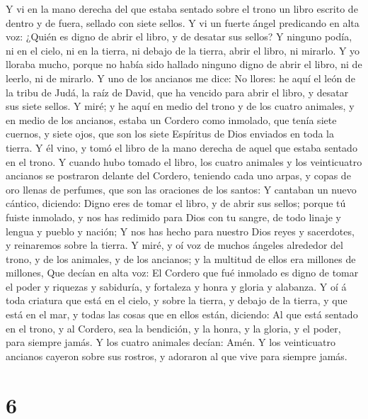  Y vi en la mano derecha del que estaba sentado sobre el
trono un libro escrito de dentro y de fuera, sellado con siete sellos.
 Y vi un fuerte ángel predicando en alta voz: ¿Quién es
digno de abrir el libro, y de desatar sus sellos?  Y ninguno
podía, ni en el cielo, ni en la tierra, ni debajo de la tierra, abrir el
libro, ni mirarlo.  Y yo lloraba mucho, porque no había sido
hallado ninguno digno de abrir el libro, ni de leerlo, ni de mirarlo.
 Y uno de los ancianos me dice: No llores: he aquí el león
de la tribu de Judá, la raíz de David, que ha vencido para abrir el
libro, y desatar sus siete sellos.  Y miré; y he aquí en
medio del trono y de los cuatro animales, y en medio de los ancianos,
estaba un Cordero como inmolado, que tenía siete cuernos, y siete ojos,
que son los siete Espíritus de Dios enviados en toda la tierra.
 Y él vino, y tomó el libro de la mano derecha de aquel que
estaba sentado en el trono.  Y cuando hubo tomado el libro,
los cuatro animales y los veinticuatro ancianos se postraron delante del
Cordero, teniendo cada uno arpas, y copas de oro llenas de perfumes, que
son las oraciones de los santos:  Y cantaban un nuevo
cántico, diciendo: Digno eres de tomar el libro, y de abrir sus sellos;
porque tú fuiste inmolado, y nos has redimido para Dios con tu sangre,
de todo linaje y lengua y pueblo y nación;  Y nos has hecho
para nuestro Dios reyes y sacerdotes, y reinaremos sobre la tierra.
 Y miré, y oí voz de muchos ángeles alrededor del trono, y
de los animales, y de los ancianos; y la multitud de ellos era millones
de millones,  Que decían en alta voz: El Cordero que fué
inmolado es digno de tomar el poder y riquezas y sabiduría, y fortaleza
y honra y gloria y alabanza.  Y oí á toda criatura que está
en el cielo, y sobre la tierra, y debajo de la tierra, y que está en el
mar, y todas las cosas que en ellos están, diciendo: Al que está sentado
en el trono, y al Cordero, sea la bendición, y la honra, y la gloria, y
el poder, para siempre jamás.  Y los cuatro animales
decían: Amén. Y los veinticuatro ancianos cayeron sobre sus rostros, y
adoraron al que vive para siempre jamás.

\hypertarget{section-5}{%
\section{6}\label{section-5}}


